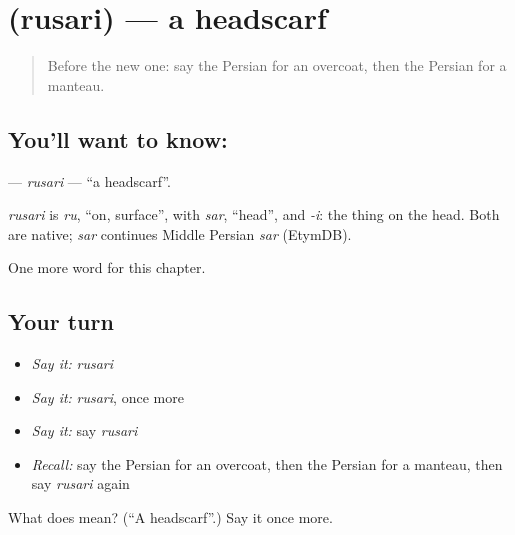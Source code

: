 \section[\texorpdfstring{\fa{روسری} (rusari)}{روسری (rusari)}]{ (rusari) — a headscarf}

\label{lesson:FA-C204-rusari}



\begin{quote}
Before the new one: say the Persian for an overcoat, then the Persian for a manteau.
\end{quote}

\subsection*{You'll want to know: }
\textbf{} — \emph{rusari} — \textquotedblleft{}a headscarf\textquotedblright{}.

\begin{cousinweb}
\emph{rusari} is \emph{ru}, \textquotedblleft{}on, surface\textquotedblright{}, with \emph{sar}, \textquotedblleft{}head\textquotedblright{}, and \emph{-i}: the thing on the head. Both are native; \emph{sar} continues Middle Persian \emph{sar} (EtymDB).
\end{cousinweb}

\begin{grammarlens}[title={What you've built}]
One more word for this chapter.
\end{grammarlens}

\subsection*{Your turn}
\begin{itemize}
\raggedright
  \item \emph{Say it:} \emph{rusari}
  \item \emph{Say it:} \emph{rusari}, once more
  \item \emph{Say it:} say \emph{rusari}
  \item \emph{Recall:} say the Persian for an overcoat, then the Persian for a manteau, then say \emph{rusari} again
\end{itemize}

\begin{tcolorbox}[breakable,colback=teal!4,colframe=teal!35!black,title={Before you move on}]
What does  mean? (\textquotedblleft{}A headscarf\textquotedblright{}.) Say it once more.
\end{tcolorbox}
